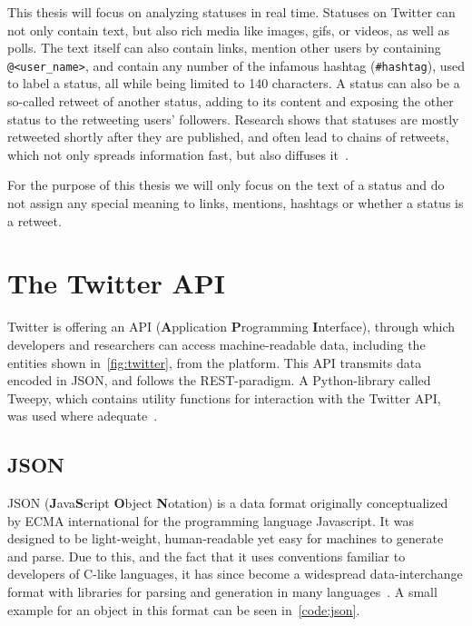 This thesis will focus on analyzing statuses in real time.
Statuses on Twitter can not only contain text, but also rich media like images, gifs, or videos, as well as polls.
The text itself can also contain links, mention other users by containing \texttt{@<user\_name>},
and contain any number of the infamous hashtag (\texttt{\#hashtag}), used to label a status, all while being limited to 140 characters.
A status can also be a so-called retweet of another status, adding to its content and exposing the other status to the retweeting users' followers.
Research shows that statuses are mostly retweeted shortly after they are published, and often lead to chains of retweets,
which not only spreads information fast, but also diffuses it~\cite{Kwak2010}.

For the purpose of this thesis we will only focus on the text of a status and do not assign any special meaning to links,
mentions, hashtags or whether a status is a retweet.\\

\section{The Twitter API}
\label{sec:theApi}

Twitter is offering an API (\textbf{A}pplication \textbf{P}rogramming \textbf{I}nterface),
through which developers and researchers can access machine-readable data,
including the entities shown in~\cref{fig:twitter}, from the platform.
This API transmits data encoded in JSON, and follows the REST-paradigm.
A Python-library called Tweepy, which contains utility functions for interaction with the Twitter API, was used where adequate~\cite{tweepyDocs}.

\subsection{JSON}
\label{subsec:json}

JSON (\textbf{J}ava\textbf{S}cript \textbf{O}bject \textbf{N}otation) is a data format originally conceptualized by ECMA international
for the programming language Javascript.
It was designed to be light-weight, human-readable yet easy for machines to generate and parse.
Due to this, and the fact that it uses conventions familiar to developers of C-like languages,
it has since become a widespread data-interchange format with libraries for parsing and generation in many languages~\cite{jsonDocs}.
A small example for an object in this format can be seen in~\cref{code:json}.



